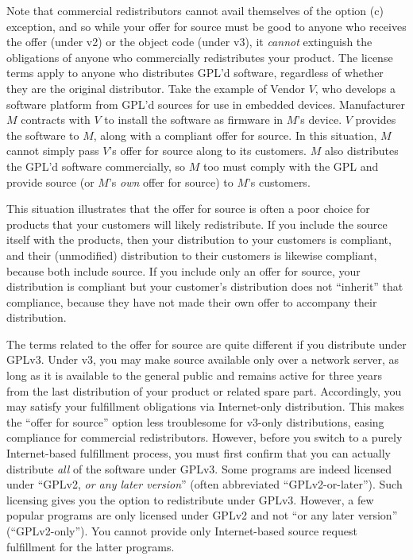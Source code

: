 Note that commercial redistributors cannot avail themselves of the option
(c) exception, and so while your offer for source must be good to anyone
who receives the offer (under v2) or the object code (under v3), it
\emph{cannot} extinguish the obligations of anyone who commercially
redistributes your product.  The license terms apply to anyone who
distributes GPL'd software, regardless of whether they are the original
distributor.  Take the example of Vendor $V$, who develops a software
platform from GPL'd sources for use in embedded devices.  Manufacturer $M$
contracts with $V$ to install the software as firmware in $M$'s device.
$V$ provides the software to $M$, along with a compliant offer for source.
In this situation, $M$ cannot simply pass $V$'s offer for source along to
its customers.  $M$ also distributes the GPL'd software commercially, so
$M$ too must comply with the GPL and provide source (or $M$'s \emph{own}
offer for source) to $M$'s customers.

This situation illustrates that the offer for source is often a poor
choice for products that your customers will likely redistribute.  If you
include the source itself with the products, then your distribution to
your customers is compliant, and their (unmodified) distribution to their
customers is likewise compliant, because both include source.  If you
include only an offer for source, your distribution is compliant but your
customer's distribution does not ``inherit'' that compliance, because they
have not made their own offer to accompany their distribution.

The terms related to the offer for source are quite different if you
distribute under GPLv3.  Under v3, you may make source available only over
a network server, as long as it is available to the general public and
remains active for three years from the last distribution of your product
or related spare part.  Accordingly, you may satisfy your fulfillment
obligations via Internet-only distribution.  This makes the ``offer for
source'' option less troublesome for v3-only distributions, easing
compliance for commercial redistributors.  However, before you switch to a
purely Internet-based fulfillment process, you must first confirm that you
can actually distribute \emph{all} of the software under GPLv3.  Some
programs are indeed licensed under ``GPLv2, \emph{or any later version}''
(often abbreviated ``GPLv2-or-later'').  Such licensing gives you the
option to redistribute under GPLv3.  However, a few popular programs are
only licensed under GPLv2 and not ``or any later version''
(``GPLv2-only'').  You cannot provide only Internet-based source request
fulfillment for the latter programs.

